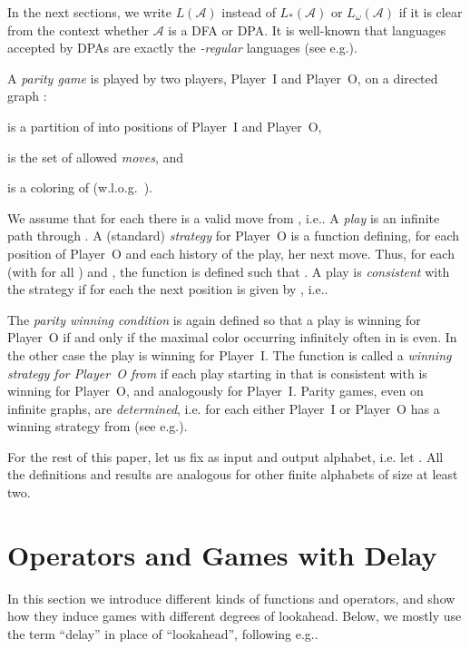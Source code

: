 \documentclass[fleqn,envcountsame]{LMCS}
\newcommand{\aut}[1]{\ensuremath{\mathcal{#1}}}
\newcommand{\pI}{Player~I\xspace}
\newcommand{\pO}{Player~O\xspace}
\newcommand{\LA}{\ensuremath{L(\aut{A})}\xspace}
\newcommand{\LsA}{\ensuremath{L_*(\aut{A})}\xspace}
\newcommand{\LoA}{\ensuremath{L_{\omega}(\aut{A})}\xspace}
\newcommand{\ie}{i.e.\xspace}
\newcommand{\eg}{e.g.\xspace}
\begin{document}
In the next sections, we write \LA instead of \LsA or \LoA if it is
clear from the context whether \aut{A} is a DFA or DPA. It is
well-known that languages accepted by DPAs are exactly the
\emph{-regular} languages (see \eg \cite{GTW02AutLogInfGam}).

A \emph{parity game}  is played by two players,
\pI and \pO, on a directed graph :
\begin{iteMize}{}
\item  is a partition of  into positions of \pI and \pO,
\item  is the set of allowed \emph{moves}, and
\item  is a coloring of 
  (w.l.o.g.\ ).
\end{iteMize}
We assume that for each  there is a valid move from ,
\ie .
A \emph{play} is an infinite path through . A (standard) \emph{strategy} for \pO is
a function  defining, for each position of \pO and each history
 of the play, her next move. Thus, for each 
(with  for all ) and , the
function  is defined such that .
A play  is \emph{consistent} with the strategy  if for each
 the next position is given by , \ie .

The \emph{parity winning condition} is again defined so that a play
 is winning for \pO if and only if the maximal color occurring
infinitely often in  is even.
In the other case the play is winning for \pI.
The function  is called a \emph{winning strategy for \pO from }
if each play starting in  that is consistent with  is winning for \pO,
and analogously for \pI. Parity games, even on infinite graphs, are
\emph{determined}, \ie for each  either \pI or \pO has a winning strategy
from  (see \eg \cite{GTW02AutLogInfGam}).

For the rest of this paper, let us fix  as input and
output alphabet, \ie let . All the definitions
and results are analogous for other finite alphabets of size
at least two.



\section{Operators and Games with Delay}\label{sec:operators_games_delay}

In this section we introduce different kinds of functions and operators,
and show how they induce games with different degrees of lookahead.
Below, we mostly use the term ``delay'' in place of ``lookahead'',
following \eg \cite{HL72FinDelSol}.
\end{document}
